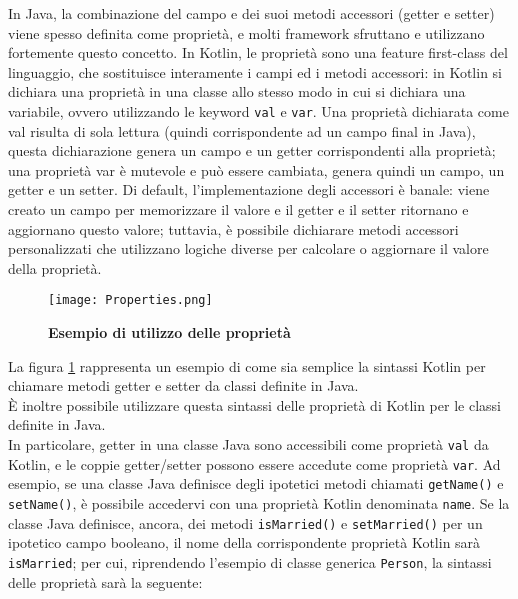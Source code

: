 In Java, la combinazione del campo e dei suoi metodi accessori (getter e setter) viene spesso definita come proprietà, e molti framework sfruttano e utilizzano fortemente questo concetto. In Kotlin, le proprietà sono una feature first-class del linguaggio, che sostituisce interamente i campi ed i metodi accessori: in Kotlin si dichiara una proprietà in una classe allo stesso modo in cui si dichiara una variabile, ovvero utilizzando le keyword \texttt{val} e \texttt{var}. Una proprietà dichiarata come val risulta di sola lettura (quindi corrispondente ad un campo final in Java), questa dichiarazione genera un campo e un getter corrispondenti alla proprietà; una proprietà var è mutevole e può essere cambiata, genera quindi un campo, un getter e un setter. Di default, l'implementazione degli accessori è banale: viene creato un campo per memorizzare il valore e il getter e il setter ritornano e aggiornano questo valore; tuttavia, è possibile dichiarare metodi accessori personalizzati che utilizzano logiche diverse per calcolare o aggiornare il valore della proprietà.\\

\begin{figure}[ht]
  \centering
  \texttt{[image: Properties.png]}
  \caption{{\bfseries Esempio di utilizzo delle proprietà}}
  \label{KotlinProperties}
\end{figure}

La figura \ref{KotlinProperties} rappresenta un esempio di come sia semplice la sintassi Kotlin per chiamare metodi getter e setter da classi definite in Java.\\

È inoltre possibile utilizzare questa sintassi delle proprietà di Kotlin per le classi definite in Java.\\
In particolare, getter in una classe Java sono accessibili come proprietà \texttt{val} da Kotlin, e le coppie getter/setter possono essere accedute come proprietà \texttt{var}. Ad esempio, se una classe Java definisce degli ipotetici metodi chiamati \texttt{getName()} e \texttt{setName()}, è possibile accedervi con una proprietà Kotlin denominata \texttt{name}. Se la classe Java definisce, ancora, dei metodi \texttt{isMarried()} e \texttt{setMarried()} per un ipotetico campo booleano, il nome della corrispondente proprietà Kotlin sarà \texttt{isMarried}; per cui, riprendendo l'esempio di classe generica \texttt{Person}, la sintassi delle proprietà sarà la seguente:\\

